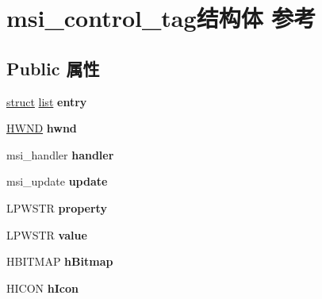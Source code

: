 \hypertarget{structmsi__control__tag}{}\section{msi\+\_\+control\+\_\+tag结构体 参考}
\label{structmsi__control__tag}
\subsection*{Public 属性}
\begin{DoxyCompactItemize}
\item 
\mbox{\label{structmsi__control__tag_a3467d171cd873de6b27cd237440f71a3}} 
\hyperlink{interfacestruct}{struct} \hyperlink{classlist}{list} {\bfseries entry}
\item 
\mbox{\label{structmsi__control__tag_ab16efc27d50169bef8bac202a7a24f6f}} 
\hyperlink{interfacevoid}{H\+W\+ND} {\bfseries hwnd}
\item 
\mbox{\label{structmsi__control__tag_a2435a13cc500158b76a8bf818131e599}} 
msi\+\_\+handler {\bfseries handler}
\item 
\mbox{\label{structmsi__control__tag_a33da1b5fe7ff7b837bc89ebc2c8d3bbc}} 
msi\+\_\+update {\bfseries update}
\item 
\mbox{\label{structmsi__control__tag_a42213769e2764a4f0d60b54d1eb0ae01}} 
L\+P\+W\+S\+TR {\bfseries property}
\item 
\mbox{\label{structmsi__control__tag_affeec712d391d04a87a99dbaf6ceda1f}} 
L\+P\+W\+S\+TR {\bfseries value}
\item 
\mbox{\label{structmsi__control__tag_a0c79516c41976125443dd40ed1032b9c}} 
H\+B\+I\+T\+M\+AP {\bfseries h\+Bitmap}
\item 
\mbox{\label{structmsi__control__tag_a87ec742974d19132907f6feaae9f4585}} 
H\+I\+C\+ON {\bfseries h\+Icon}
\item 
\mbox{\label{structmsi__control__tag_a6787035455067cba2bfc92a832350265}} 

\end{DoxyCompactItemize}
